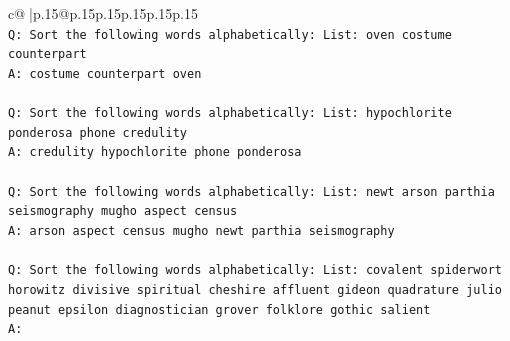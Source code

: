 \documentclass{article}
\begin{document}
{\begin{supertabular}{c@{$\;$}|p{.15\linewidth}@{}p{.15\linewidth}p{.15\linewidth}p{.15\linewidth}p{.15\linewidth}p{.15\linewidth}}
{{{\\ 
\texttt{Q: Sort the following words alphabetically: List: oven costume counterpart} \\
\texttt{A: costume counterpart oven} \\
\\ 
\texttt{Q: Sort the following words alphabetically: List: hypochlorite ponderosa phone credulity} \\
\texttt{A: credulity hypochlorite phone ponderosa} \\
\\ 
\texttt{Q: Sort the following words alphabetically: List: newt arson parthia seismography mugho aspect census} \\
\texttt{A: arson aspect census mugho newt parthia seismography} \\
\\ 
\texttt{Q: Sort the following words alphabetically: List: covalent spiderwort horowitz divisive spiritual cheshire affluent gideon quadrature julio peanut epsilon diagnostician grover folklore gothic salient} \\
\texttt{A:} \\
            }
        }
    }
     \\ \\


\end{supertabular}}
\end{document}
